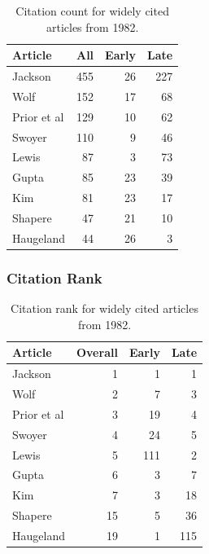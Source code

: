 \documentclass[
  10pt,
  letterpaper,
  DIV=11,
  numbers=noendperiod,
  twoside]{scrartcl}
\begin{document}
\begin{longtable}[]{@{}lrrr@{}}

\caption{\label{tbl-citation-count-1982}Citation count for widely cited
articles from 1982.}

\tabularnewline

\toprule\noalign{}
Article & All & Early & Late \\
\midrule\noalign{}
\endhead
\bottomrule\noalign{}
\endlastfoot
Jackson & 455 & 26 & 227 \\
Wolf & 152 & 17 & 68 \\
Prior et al & 129 & 10 & 62 \\
Swoyer & 110 & 9 & 46 \\
Lewis & 87 & 3 & 73 \\
Gupta & 85 & 23 & 39 \\
Kim & 81 & 23 & 17 \\
Shapere & 47 & 21 & 10 \\
Haugeland & 44 & 26 & 3 \\

\end{longtable}

\subsubsection*{Citation Rank}\label{citation-rank-6}

\begin{longtable}[]{@{}lrrr@{}}

\caption{\label{tbl-citation-rank-1982}Citation rank for widely cited
articles from 1982.}

\tabularnewline

\toprule\noalign{}
Article & Overall & Early & Late \\
\midrule\noalign{}
\endhead
\bottomrule\noalign{}
\endlastfoot
Jackson & 1 & 1 & 1 \\
Wolf & 2 & 7 & 3 \\
Prior et al & 3 & 19 & 4 \\
Swoyer & 4 & 24 & 5 \\
Lewis & 5 & 111 & 2 \\
Gupta & 6 & 3 & 7 \\
Kim & 7 & 3 & 18 \\
Shapere & 15 & 5 & 36 \\
Haugeland & 19 & 1 & 115 \\

\end{longtable}
\end{document}
